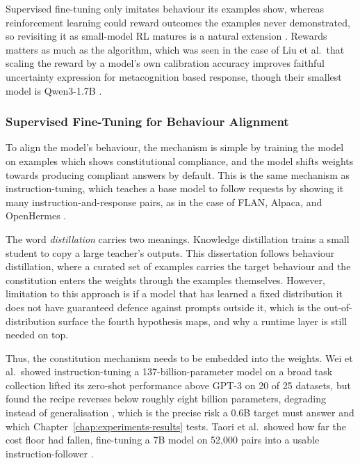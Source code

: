 Supervised fine-tuning only imitates behaviour its examples show, whereas reinforcement learning could reward outcomes the examples never demonstrated, so revisiting it as small-model RL matures is a natural extension \cite{shao2024deepseekmathpushinglimitsmathematical, yu2025dapoopensourcellmreinforcement}. Rewards matters as much as the algorithm, which was seen in the case of Liu et al.\ that scaling the reward by a model's own calibration accuracy improves faithful uncertainty expression for  metacognition based response, though their smallest model is Qwen3-1.7B \cite{liu2026reinforcementlearningmetacognitivefeedback}.

\subsubsection{Supervised Fine-Tuning for Behaviour Alignment}
\label{subsec:supervised-fine-tuning-for-behaviour-alignment}

To align the model's behaviour, the mechanism is simple by training the model on examples which shows constitutional compliance, and the model shifts weights towards producing compliant answers by default. This is the same mechanism as instruction-tuning, which teaches a base model to follow requests by showing it many instruction-and-response pairs, as in the case of FLAN, Alpaca, and OpenHermes \cite{wei2022finetunedlanguagemodelszeroshot, taori2023alpaca, teknium2024openhermes}. 

The word \emph{distillation} carries two meanings. Knowledge distillation trains a small student to copy a large teacher's outputs. This dissertation follows behaviour distillation, where a curated set of examples carries the target behaviour and the constitution enters the weights through the examples themselves. However, limitation to this approach is if a model that has learned a fixed distribution it does not have guaranteed defence against prompts outside it, which is the out-of-distribution surface the fourth hypothesis maps, and why a runtime layer is still needed on top.

Thus, the constitution mechanism needs to be embedded into the weights. Wei et al.\ showed instruction-tuning a 137-billion-parameter model on a broad task collection lifted its zero-shot performance above GPT-3 on 20 of 25 datasets, but found the recipe reverses below roughly eight billion parameters, degrading instead of generalisation \cite{wei2022finetunedlanguagemodelszeroshot}, which is the precise risk a 0.6B target must answer and which Chapter~\ref{chap:experiments-results} tests. Taori et al.\ showed how far the cost floor had fallen, fine-tuning a 7B model on 52,000 pairs into a usable instruction-follower \cite{taori2023alpaca}.

